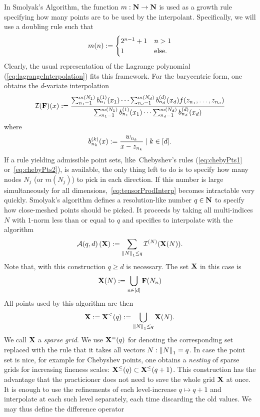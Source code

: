\documentclass[12pt, oneside]{amsart}
\theoremstyle{definition}
\theoremstyle{remark}
\numberwithin{equation}{section}
\begin{document}
In Smolyak's Algorithm, the function \(m: \N \to \N\) is used as a growth rule specifying how many points are to be used by the interpolant. Specifically, we will use a doubling rule such that \[
    m(n) \defn \begin{cases}
        2^{n-1}+1 &n > 1\\
        1 &\text{else}.
    \end{cases}
\]
Clearly, the usual representation of the Lagrange polynomial (\ref{eq:lagrangeInterpolation}) fits this framework. For the barycentric form, one obtains the \(d\)-variate interpolation
\begin{equation}\label{eq:multivarBarycentric}
    \cI(\FF)(x) \defn \frac{\sum_{n_1=1}^{m(N_1)} b^{(1)}_{n_1}(x_1) \cdots \sum_{n_d=1}^{m(N_d)}b^{(d)}_{n_d}(x_d) f(z_{n_1}, \dots, z_{n_d})}{\sum_{n_1=1}^{m(N_1)} b^{(1)}_{n_1}(x_1) \cdots \sum_{n_d=1}^{m(N_d)}b^{(d)}_{n_d}(x_d)}
\end{equation}
where
\begin{equation}\label{eq:barycentricBasis}
    b^{(k)}_{n_k}(x) \defn \frac{w_{n_k}}{x-z_{n_k}} \mid k \in [d].
\end{equation}
If a rule yielding admissible point sets, like\ Chebyshev's rules (\ref{eq:chebyPts1} or\ \ref{eq:chebyPts2}), is available, the only thing left to do is to specify how many nodes \(N_j\) (or \(m(N_j)\)) to pick in each direction. If this number is large simultaneously for all dimensions,\ \cref{eq:tensorProdInterp} becomes intractable very quickly. Smolyak's algorithm defines a resolution-like number \(q \in \N\) to specify how close-meshed points should be picked. It proceeds by taking all multi-indices \(N\) with \(1\)-norm less than or equal to \(q\) and specifies to interpolate with the algorithm
\begin{equation}\label{eq:smolyak}
    \cA(q, d)\left(\XX\right) \defn \sum_{\norm[1]{N} \leq q} \cI^{(N)}(\XX(N)).
\end{equation}
Note that, with this construction \(q \geq d\) is necessary. The set \(\XX\) in this case is
\begin{equation}\label{eq:indexGrid}
    \XX(N) \defn \bigcup_{n \in [d]} \FF(N_n)
\end{equation}
All points used by this algorithm are then
\begin{equation}\label{eq:sparseGrid}
    \XX \defn \XX^\leq(q) \defn \bigcup_{\norm[1]{N} \leq q} \XX(N).
\end{equation}
We call \(\XX\) a \emph{sparse grid}. We use \(\XX^=(q)\) for denoting the corresponding set replaced with the rule that it takes all vectors \(N: \norm[1]{N} = q\). In case the point set is nice, for example for Chebyshev points, one obtains a \emph{nesting} of sparse grids for increasing fineness scales: \(\XX^\leq(q) \subset \XX^\leq(q+1)\). This construction has the advantage that the practicioner does not need to save the whole grid \(\XX\) at once. It is enough to use the refinements of each level-increase \(q \mapsto q+1\) and interpolate at each such level separately, each time discarding the old values. We may thus define the difference operator
\end{document}
